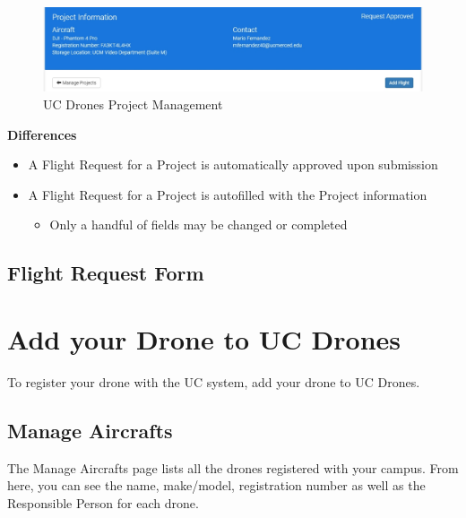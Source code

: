 \documentclass[
]{book}
\providecommand{\tightlist}{%
  \setlength{\itemsep}{0pt}\setlength{\parskip}{0pt}}
\begin{document}
\begin{figure}

{\centering \includegraphics[width=0.85\linewidth]{images/UCDrones_project_addflight} 

}

\caption{UC Drones Project Management}\label{fig:UCDrones-project-flight-2}
\end{figure}

\textbf{Differences}

\begin{itemize}
\tightlist
\item
  A Flight Request for a Project is automatically approved upon submission
\item
  A Flight Request for a Project is autofilled with the Project information

  \begin{itemize}
  \tightlist
  \item
    Only a handful of fields may be changed or completed
  \end{itemize}
\end{itemize}

\hypertarget{flight-request-form}{%
\section{Flight Request Form}\label{flight-request-form}}

\hypertarget{ch-add-drone}{%
\chapter{Add your Drone to UC Drones}\label{ch-add-drone}}

To register your drone with the UC system, add your drone to UC Drones.

\hypertarget{manag-aircraft}{%
\section{Manage Aircrafts}\label{manag-aircraft}}

The Manage Aircrafts page lists all the drones registered with your campus. From here, you can see the name, make/model, registration number as well as the Responsible Person for each drone.
\end{document}
